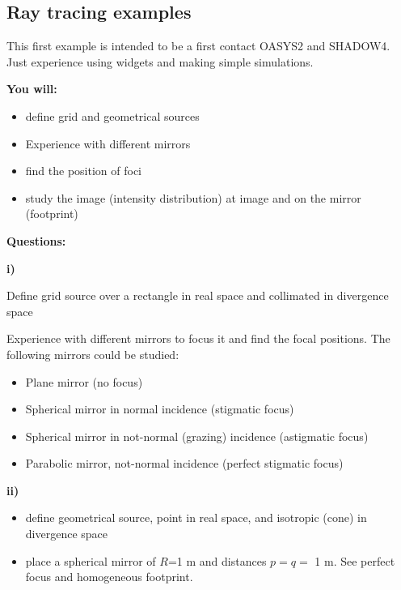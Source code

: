 \subsection{Ray tracing examples}

This first example is intended to be a first contact OASYS2 and SHADOW4. Just experience using widgets and making simple simulations.

\begin{youwillbox}
\textbf{You will:}

\begin{itemize}
    \item define grid and geometrical sources
    \item Experience with different mirrors
    \item find the position of foci
    \item study the image (intensity distribution) at image and on the mirror (footprint)
\end{itemize}
\end{youwillbox}

\begin{questionsbox}
\textbf{Questions:}

\textbf{i)}

Define grid source over a rectangle in real space and collimated in divergence space

Experience with different mirrors to focus it and find the focal positions. The following mirrors could be studied:

\begin{itemize}
    \item Plane mirror (no focus)
    \item Spherical mirror in normal incidence (stigmatic focus)
    \item Spherical mirror in not-normal (grazing) incidence (astigmatic focus)
    \item Parabolic mirror, not-normal incidence (perfect stigmatic focus)
\end{itemize}

\textbf{ii)}

\begin{itemize}
    \item define geometrical source, point in real space, and isotropic (cone) in divergence space
    \item place a spherical mirror of $R$=1 m and distances $p=q=$ 1 m. See perfect focus and homogeneous footprint.
\end{itemize}
\end{questionsbox}

